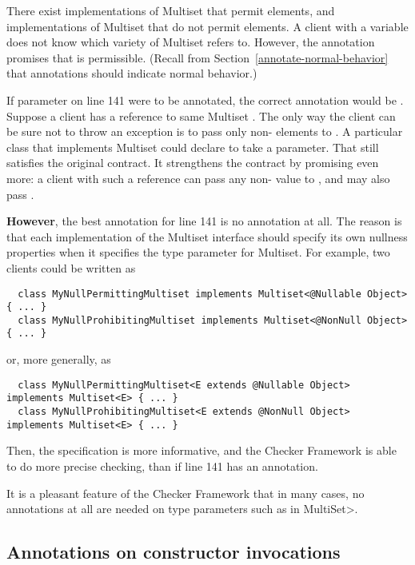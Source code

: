 There exist implementations of Multiset that permit  elements,
and implementations of Multiset that do not permit  elements.  A
client with a variable  does not know which variety of
Multiset  refers to.  However, the  annotation
promises that  is permissible.  (Recall from
Section~\ref{annotate-normal-behavior} that annotations should indicate
normal behavior.)

If parameter  on line 141 were to be annotated, the correct
annotation would be .  Suppose a client has a reference to
same Multiset .  The only way the client can be sure not to throw an exception is to pass
only non- elements to .  A particular class
that implements Multiset could declare  to take a
 parameter.  That still satisfies the original contract.
It strengthens the contract by promising even more:  a client with such a
reference can pass any non- value to , and may also
pass .

\textbf{However}, the best annotation for line 141 is no annotation at all.
The reason is that each implementation of the Multiset interface should
specify its own nullness properties when it specifies the type parameter
for Multiset.  For example, two clients could be written as

\begin{Verbatim}
  class MyNullPermittingMultiset implements Multiset<@Nullable Object> { ... }
  class MyNullProhibitingMultiset implements Multiset<@NonNull Object> { ... }
\end{Verbatim}

\noindent
or, more generally, as

\begin{Verbatim}
  class MyNullPermittingMultiset<E extends @Nullable Object> implements Multiset<E> { ... }
  class MyNullProhibitingMultiset<E extends @NonNull Object> implements Multiset<E> { ... }
\end{Verbatim}

Then, the specification is more informative, and the Checker Framework is
able to do more precise checking, than if line 141 has an annotation.

It is a pleasant feature of the Checker Framework that in many cases, no
annotations at all are needed on type parameters such as  in \<MultiSet>.


\subsection{Annotations on constructor invocations\label{annotations-on-constructor-invocations}}

